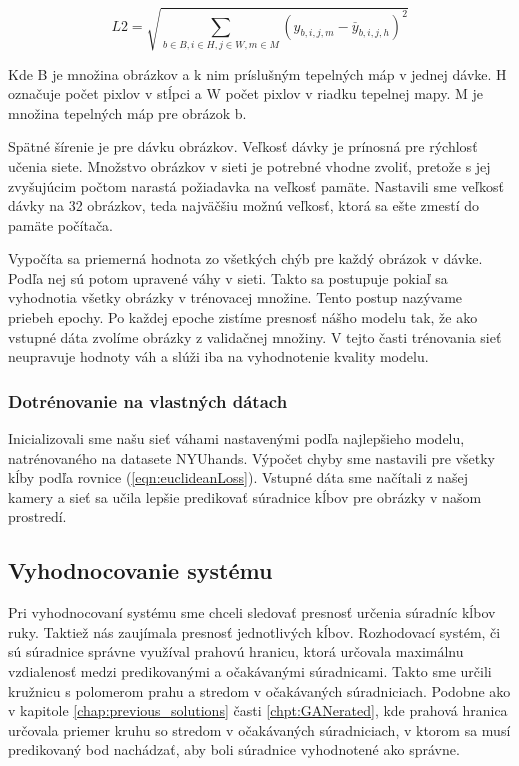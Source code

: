 \begin{equation}\label{eqn:euclideanLoss}
    L2 = \sqrt{\sum_{b \in B, i \in H, j \in W, m \in M}{\left(y_{b,i,j,m} - \overset{\_}{y}_{b,i,j,h}\right)^{2}}}
\end{equation}

Kde B je množina obrázkov a k nim príslušným tepelných máp v jednej dávke. H označuje počet pixlov v stĺpci a W počet pixlov v riadku tepelnej mapy. M je množina tepelných máp pre obrázok b.

Spätné šírenie je pre dávku obrázkov. Veľkosť dávky je prínosná pre rýchlosť učenia siete. Množstvo obrázkov v sieti je potrebné vhodne zvoliť, pretože s jej zvyšujúcim počtom narastá požiadavka na veľkosť pamäte. Nastavili sme veľkosť dávky na 32 obrázkov, teda najväčšiu možnú veľkosť, ktorá sa ešte zmestí do pamäte počítača. 

Vypočíta sa priemerná hodnota zo všetkých chýb pre každý obrázok v dávke. Podľa nej sú potom upravené váhy v sieti. Takto sa postupuje pokiaľ sa vyhodnotia všetky obrázky v trénovacej množine. Tento postup nazývame priebeh epochy. Po každej epoche zistíme presnosť nášho modelu tak, že ako vstupné dáta zvolíme obrázky z validačnej množiny. V tejto časti trénovania sieť neupravuje hodnoty váh a slúži iba na vyhodnotenie kvality modelu.

\subsubsection{Dotrénovanie na vlastných dátach}
Inicializovali sme našu sieť váhami nastavenými podľa najlepšieho modelu, natrénovaného na datasete NYUhands. Výpočet chyby sme nastavili pre všetky kĺby podľa rovnice (\ref{eqn:euclideanLoss}). Vstupné dáta sme načítali z našej kamery a sieť sa učila lepšie predikovať súradnice kĺbov pre obrázky v našom prostredí.

\subsection{Vyhodnocovanie systému}
Pri vyhodnocovaní systému sme chceli sledovať presnosť určenia súradníc kĺbov ruky. Taktiež nás zaujímala presnosť jednotlivých kĺbov. Rozhodovací systém, či sú súradnice správne využíval prahovú hranicu, ktorá určovala maximálnu vzdialenosť medzi predikovanými a očakávanými súradnicami. Takto sme určili kružnicu s polomerom prahu a stredom v očakávaných súradniciach. Podobne ako v kapitole \ref{chap:previous_solutions} časti \ref{chpt:GANerated}, kde prahová hranica určovala priemer kruhu so stredom v očakávaných súradniciach, v ktorom sa musí predikovaný bod nachádzať, aby boli súradnice vyhodnotené ako správne. 

